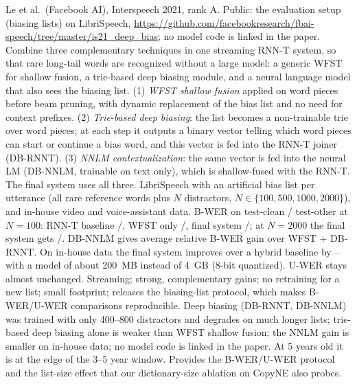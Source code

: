   {Le et al.\ (Facebook AI), Interspeech 2021, rank A. Public: the evaluation setup (biasing lists) on LibriSpeech,
   \url{https://github.com/facebookresearch/fbai-speech/tree/master/is21_deep_bias}; no model code is linked in the paper.}
  {Combine three complementary techniques in one streaming RNN-T system, so that rare long-tail words are recognized
   without a large model: a generic WFST for shallow fusion, a trie-based deep biasing module, and a neural language model that also sees the biasing list.}
  {(1) \emph{WFST shallow fusion} applied on word pieces before beam pruning, with dynamic replacement of the bias list and no need for context prefixes.
   (2) \emph{Trie-based deep biasing}: the list becomes a non-trainable trie over word pieces; at each step it outputs a binary vector
   telling which word pieces can start or continue a bias word, and this vector is fed into the RNN-T joiner (DB-RNNT).
   (3) \emph{NNLM contextualization}: the same vector is fed into the neural LM (DB-NNLM, trainable on text only),
   which is shallow-fused with the RNN-T. The final system uses all three.}
  {LibriSpeech with an artificial bias list per utterance (all rare reference words plus $N$ distractors, $N\in\{100,500,1000,2000\}$),
   and in-house video and voice-assistant data. B-WER on test-clean / test-other at $N{=}100$:
   RNN-T baseline /, WFST only /, final system /;
   at $N{=}2000$ the final system gets /.
   DB-NNLM gives  average relative B-WER gain over WFST + DB-RNNT. On in-house data the final system improves
   over a hybrid baseline by -- with a model of about 200~MB instead of 4~GB (8-bit quantized).
   U-WER stays almost unchanged.}
  {Streaming; strong, complementary gains; no retraining for a new list; small footprint; releases the biasing-list protocol, which makes B-WER/U-WER comparisons reproducible.}
  {Deep biasing (DB-RNNT, DB-NNLM) was trained with only 400--800 distractors and degrades on much longer lists;
   trie-based deep biasing alone is weaker than WFST shallow fusion; the NNLM gain is smaller on in-house data;
   no model code is linked in the paper. At 5 years old it is at the edge of the 3--5 year window.}
  {Provides the B-WER/U-WER protocol and the list-size effect that our dictionary-size ablation on CopyNE also probes.}

